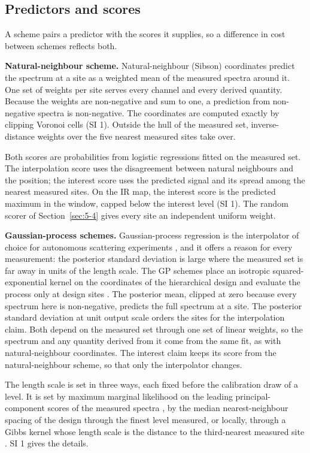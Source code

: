 \documentclass{iopjournal}
\begin{document}
\hypertarget{sec:4-3}{%
\subsection{Predictors and scores}\label{sec:4-3}}

A scheme pairs a predictor with the scores it supplies, so a difference in cost between schemes reflects both.

\textbf{Natural-neighbour scheme.} Natural-neighbour (Sibson) coordinates \cite{Sibson1981} predict the spectrum at a site as a weighted mean of the measured spectra around it. One set of weights per site serves every channel and every derived quantity. Because the weights are non-negative and sum to one, a prediction from non-negative spectra is non-negative. The coordinates are computed exactly by clipping Voronoi cells (SI 1). Outside the hull of the measured set, inverse-distance weights over the five nearest measured sites take over.

Both scores are probabilities from logistic regressions fitted on the measured set. The interpolation score uses the disagreement between natural neighbours and the position; the interest score uses the predicted signal and its spread among the nearest measured sites. On the IR map, the interest score is the predicted maximum in the window, capped below the interest level (SI 1). The random scorer of Section~\ref{sec:5-4} gives every site an independent uniform weight.

\textbf{Gaussian-process schemes.} Gaussian-process regression is the interpolator of choice for autonomous scattering experiments \cite{Noack2019,Noack2020}, and it offers a reason for every measurement: the posterior standard deviation is large where the measured set is far away in units of the length scale. The GP schemes place an isotropic squared-exponential kernel on the coordinates of the hierarchical design and evaluate the process only at design sites \cite{RasmussenWilliams2006}. The posterior mean, clipped at zero because every spectrum here is non-negative, predicts the full spectrum at a site. The posterior standard deviation at unit output scale orders the sites for the interpolation claim. Both depend on the measured set through one set of linear weights, so the spectrum and any quantity derived from it come from the same fit, as with natural-neighbour coordinates. The interest claim keeps its score from the natural-neighbour scheme, so that only the interpolator changes.

The length scale is set in three ways, each fixed before the calibration draw of a level. It is set by maximum marginal likelihood on the leading principal-component scores of the measured spectra \cite{Balandat2020}, by the median nearest-neighbour spacing of the design through the finest level measured, or locally, through a Gibbs kernel whose length scale is the distance to the third-nearest measured site \cite{Gibbs1997,PaciorekSchervish2004}. SI 1 gives the details.
\end{document}
